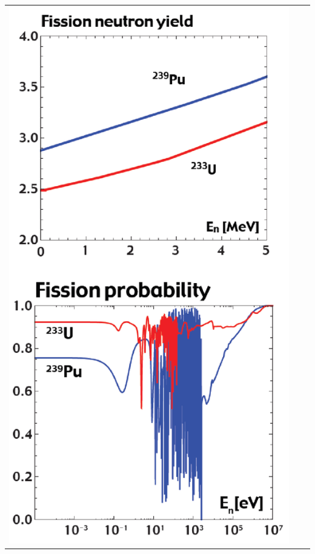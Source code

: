 \documentclass{school-22.211-notes}
\begin{document}
\begin{enumerate}
  \begin{tabular}{ccc}
    \begin{minipage}[b]{0.3\linewidth}
      \includegraphics[width=\textwidth]{images/dfs/U-vs-Th.png}
    \end{minipage}
    &
    \begin{minipage}[b]{0.3\linewidth}

\end{minipage}
\end{tabular}
\end{enumerate}
\end{document}
